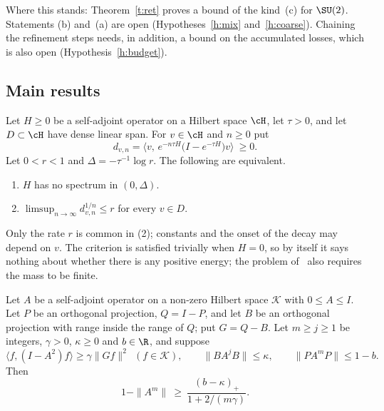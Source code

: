 Where this stands: Theorem~\ref{t:ret} proves a bound of the kind~(c) for $\SU(2)$. Statements (b) and~(a)
are open (Hypotheses~\ref{h:mix} and~\ref{h:coarse}). Chaining the refinement steps needs, in addition, a
bound on the accumulated losses, which is also open (Hypothesis~\ref{h:budget}).

\subsection{Main results}
\begin{theorem}\label{t:crit}
Let $H\ge0$ be a self-adjoint operator on a Hilbert space $\cH$, let $\tau>0$, and let $D\subset\cH$ have dense
linear span. For $v\in\cH$ and $n\ge0$ put
\[
d_{v,n}=\big\langle v,\,e^{-n\tau H}\big(I-e^{-\tau H}\big)v\big\rangle\ \ge0 .
\]
Let $0<r<1$ and $\Delta=-\tau^{-1}\log r$. The following are equivalent.
\begin{enumerate}
\item $H$ has no spectrum in $(0,\Delta)$.
\item $\limsup_{n\to\infty}d_{v,n}^{1/n}\le r$ for every $v\in D$.
\end{enumerate}
\end{theorem}

Only the rate $r$ is common in (2); constants and the onset of the decay may depend on $v$. The criterion is
satisfied trivially when $H=0$, so by itself it says nothing about whether there is any positive energy; the
problem of~\cite{JW} also requires the mass to be finite.

\begin{theorem}\label{t:inh}
Let $A$ be a self-adjoint operator on a non-zero Hilbert space $\mathcal K$ with $0\le A\le I$. Let $P$ be an
orthogonal projection, $Q=I-P$, and let $B$ be an orthogonal projection with range inside the range of $Q$;
put $G=Q-B$. Let $m\ge j\ge1$ be integers, $\gamma>0$, $\kappa\ge0$ and $b\in\R$, and suppose
\begin{equation}\label{e:hyp}
\langle f,(I-A^{2})f\rangle\ge\gamma\|Gf\|^2\ \ (f\in\mathcal K),\qquad
\|BA^{j}B\|\le\kappa,\qquad \|PA^{m}P\|\le1-b .
\end{equation}
Then
\begin{equation}\label{e:inh}
1-\|A^m\|\ \ge\ \frac{(b-\kappa)_+}{1+2/(m\gamma)} .
\end{equation}
\end{theorem}

